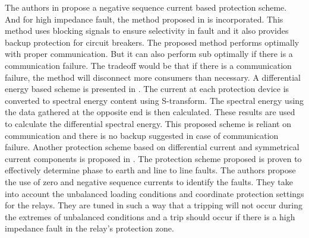 The authors in \cite{PR143} propose a negative sequence current based protection scheme. And for high impedance fault, the method proposed in \cite{PR144} is incorporated. This method uses blocking signals to ensure selectivity in fault and it also provides backup protection for circuit breakers. The proposed method performs optimally with proper communication. But it can also perform sub optimally if there is a communication failure. The tradeoff would be that if there is a communication failure, the method will disconnect more consumers than necessary. 
A differential energy based scheme is presented in  \cite{PR145}. The current at each protection device is converted to spectral energy content using S-transform. The spectral energy using the data gathered at the opposite end is then calculated. These results are used to calculate the differential spectral energy. This proposed scheme is reliant on communication and there is no backup suggested in case of communication failure. 
Another protection scheme based on differential current and symmetrical current components is proposed in \cite{PR146}. The protection scheme proposed is proven to effectively determine phase to earth and line to line faults. The authors propose the use of zero and negative sequence currents to identify the faults. They take into account the unbalanced loading conditions and coordinate protection settings for the relays. They are tuned in such a way that a tripping will not occur during the extremes of unbalanced conditions and a trip should occur if there is a high impedance fault in the relay’s protection zone.
